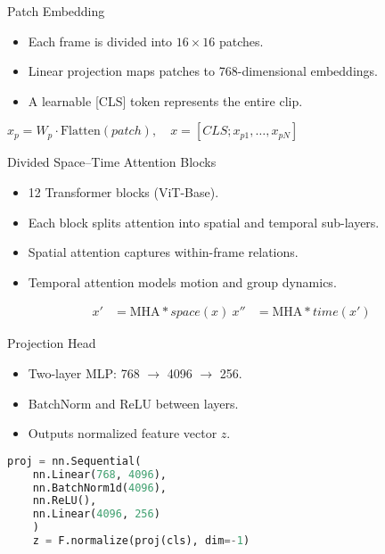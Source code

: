 \documentclass{beamer}
\begin{document}
\begin{frame}{Patch Embedding}
    \begin{itemize}
        \item Each frame is divided into $16\times16$ patches.
        \item Linear projection maps patches to 768-dimensional embeddings.
        \item A learnable [CLS] token represents the entire clip.
    \end{itemize}
    \begin{math}
        x_p = W_p \cdot \text{Flatten}(patch), \quad x = [CLS; x_{p1}, \ldots, x_{pN}]
    \end{math}
\end{frame}

\begin{frame}{Divided Space--Time Attention Blocks}
    \begin{itemize}
        \item 12 Transformer blocks (ViT-Base).
        \item Each block splits attention into spatial and temporal sub-layers.
        \item Spatial attention captures within-frame relations.
        \item Temporal attention models motion and group dynamics.
    \end{itemize}
    \begin{align*}
        x'  & = \text{MHA}*{space}(x) \
        x'' & = \text{MHA}*{time}(x')
    \end{align*}
\end{frame}

\begin{frame}[fragile]{Projection Head}
    \begin{itemize}
        \item Two-layer MLP: 768 $\rightarrow$ 4096 $\rightarrow$ 256.
        \item BatchNorm and ReLU between layers.
        \item Outputs normalized feature vector $z$.
    \end{itemize}
    \begin{lstlisting}[language=Python, basicstyle=\ttfamily\scriptsize]
    proj = nn.Sequential(
    nn.Linear(768, 4096),
    nn.BatchNorm1d(4096),
    nn.ReLU(),
    nn.Linear(4096, 256)
    )
    z = F.normalize(proj(cls), dim=-1)
\end{lstlisting}
\end{frame}
\end{document}

